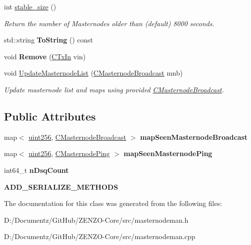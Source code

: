 \begin{DoxyCompactItemize}
int \mbox{\hyperlink{class_c_masternode_man_a35baa3dcb49d2a8e38376747b7b44c59}{stable\+\_\+size}} ()
\begin{DoxyCompactList}\small\item\em Return the number of Masternodes older than (default) 8000 seconds. \end{DoxyCompactList}\item 
\mbox{\label{class_c_masternode_man_a7308c49a95bf9313a71a0b988256cfb4}} 
std\+::string {\bfseries To\+String} () const
\item 
\mbox{\label{class_c_masternode_man_aa36d42c46e914925b9cf0fa34fc712f1}} 
void {\bfseries Remove} (\mbox{\hyperlink{class_c_tx_in}{C\+Tx\+In}} vin)
\item 
\mbox{\label{class_c_masternode_man_aed8b4c3eec39239a4c63c2cda5e7588c}} 
void \mbox{\hyperlink{class_c_masternode_man_aed8b4c3eec39239a4c63c2cda5e7588c}{Update\+Masternode\+List}} (\mbox{\hyperlink{class_c_masternode_broadcast}{C\+Masternode\+Broadcast}} mnb)
\begin{DoxyCompactList}\small\item\em Update masternode list and maps using provided \mbox{\hyperlink{class_c_masternode_broadcast}{C\+Masternode\+Broadcast}}. \end{DoxyCompactList}\end{DoxyCompactItemize}
\subsection*{Public Attributes}
\begin{DoxyCompactItemize}
\item 
\mbox{\label{class_c_masternode_man_a9fe5b66d097008700dc4abb28e9a50d5}} 
map$<$ \mbox{\hyperlink{classuint256}{uint256}}, \mbox{\hyperlink{class_c_masternode_broadcast}{C\+Masternode\+Broadcast}} $>$ {\bfseries map\+Seen\+Masternode\+Broadcast}
\item 
\mbox{\label{class_c_masternode_man_a9efa7ab1dcd28acc3039ae46f4da0361}} 
map$<$ \mbox{\hyperlink{classuint256}{uint256}}, \mbox{\hyperlink{class_c_masternode_ping}{C\+Masternode\+Ping}} $>$ {\bfseries map\+Seen\+Masternode\+Ping}
\item 
\mbox{\label{class_c_masternode_man_a8527c447711c3909cf1bdefec1a7e9be}} 
int64\+\_\+t {\bfseries n\+Dsq\+Count}
\item 
\mbox{\label{class_c_masternode_man_ae39ed8b30469e9fdc42aa09d175e1f78}} 
{\bfseries A\+D\+D\+\_\+\+S\+E\+R\+I\+A\+L\+I\+Z\+E\+\_\+\+M\+E\+T\+H\+O\+DS}
\end{DoxyCompactItemize}


The documentation for this class was generated from the following files\+:\begin{DoxyCompactItemize}
\item 
D\+:/\+Documentz/\+Git\+Hub/\+Z\+E\+N\+Z\+O-\/\+Core/src/masternodeman.\+h\item 
D\+:/\+Documentz/\+Git\+Hub/\+Z\+E\+N\+Z\+O-\/\+Core/src/masternodeman.\+cpp\end{DoxyCompactItemize}
